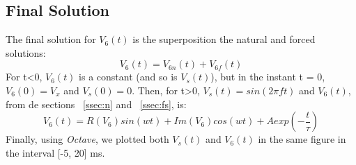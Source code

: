\subsection{Final Solution}
\label{ssec:fin}
The final solution for $V_6(t)$ is the superposition the natural and forced solutions:
\begin{equation}
V_6(t) = V_{6n}(t) + V_{6f}(t)
\end{equation}
For t\textless0, $V_6(t)$ is a constant (and so is $V_s(t)$), but in the instant t = 0, $V_6(0)=V_x$ and $V_s(0) = 0$. Then, for t\textgreater0, $V_s(t) = sin(2\pi ft)$ and $V_6(t)$, from de sections ~\ref{ssec:n} and ~\ref{ssec:fs}, is:
\begin{equation}
V_6(t) = R(V_6)sin(wt)+Im(V_6)cos(wt)+Aexp(-\frac{t}{\tau})
\end{equation}
Finally, using \textit{Octave}, we plotted both $V_s(t)$ and $V_6(t)$ in the same figure in the interval [-5, 20] ms.
